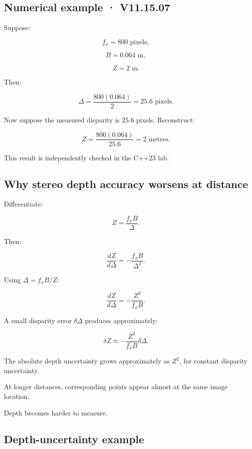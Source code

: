 \subsection{Numerical example · V11.15.07}\label{02-foundations-ii-ch035-numerical-example-v11.15.07}

Suppose:

\[ f_x=800\text{ pixels}, \]

\[ B=0.064\text{ m}, \]

\[ Z=2\text{ m}. \]

Then:

\[ \Delta=\frac{800(0.064)}2 =\boxed{25.6\text{ pixels}}. \]

Now suppose the measured disparity is 25.6 pixels. Reconstruct:

\[ Z=\frac{800(0.064)}{25.6} =\boxed{2\text{ metres}}. \]

This result is independently checked in the C++23 lab.

\subsection{Why stereo depth accuracy worsens at distance}\label{02-foundations-ii-ch035-why-stereo-depth-accuracy-worsens-at-distance}

Differentiate:

\[ Z=\frac{f_xB}{\Delta}. \]

Then:

\[ \frac{dZ}{d\Delta} = -\frac{f_xB}{\Delta^2}. \]

Using \(\Delta=f_xB/Z\):

\[ \boxed{ \frac{dZ}{d\Delta} = -\frac{Z^2}{f_xB}. } \]

A small disparity error \(\delta\Delta\) produces approximately:

\[ \boxed{ \delta Z\approx -\frac{Z^2}{f_xB}\delta\Delta. } \]

The absolute depth uncertainty grows approximately as \(Z^2\), for constant disparity uncertainty.

At longer distances, corresponding points appear almost at the same image location.

Depth becomes harder to measure.

\subsection{Depth-uncertainty example}\label{02-foundations-ii-ch035-depth-uncertainty-example}

